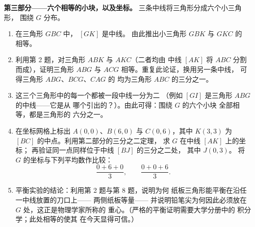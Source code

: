 \begin{problem}
\medskip
\noindent\textbf{第三部分——六个相等的小块，以及坐标。}
三条中线将三角形分成六个小三角形，
围绕 $G$ 分布。
\begin{enumerate}[resume]
  \item 在三角形 $GBC$ 中， $[GK]$ 是中线。
        由此推出小三角形 $GBK$ 与 $GKC$ 的
        相等。
  \item 利用第 2 题，对三角形 $ABK$ 与 $AKC$（二者均由
        中线 $[AK]$ 将 $ABC$ 分割而成），证明三角形 $ABG$ 与 $ACG$
        相等。重复此论证，换用另一条中线，
        可得三角形 $ABG$、$BCG$、$CAG$ 的
        均为三角形 $ABC$ 的三分之一。
  \item 这三个三角形中的每一个都被一段中线一分为二
        （例如 $[GI]$ 是三角形 $ABG$ 的中线——它是从
        哪个引出的？）。由此可得：围绕 $G$ 的六个小块
        全部相等，都是三角形的
        六分之一。
  \item 在坐标网格上标出 $A(0, 0)$、$B(6, 0)$ 与
        $C(0, 6)$，其中 $K(3, 3)$ 为 $[BC]$ 的中点。利用第二部分的三分之二定理，
        求 $G$ 在中线 $[AK]$ 上的坐标；
        再验证同一点同样位于中线 $[BJ]$ 的三分之二处，
        其中 $J(0, 3)$。
        将 $G$ 的坐标与下列平均数作比较：
        \[
        \frac{0 + 6 + 0}{3},
        \qquad
        \frac{0 + 0 + 6}{3} .
        \]
  \item 平衡实验的结论：利用第 2 题与第 8 题，说明为何
        纸板三角形能平衡在沿任一中线放置的刀口上——
        两侧纸板等量——
        并说明铅笔尖为何因此必须放在
        $G$ 处，这正是物理学家所称的
        重心。（严格的平衡证明需要大学分册中的
        积分学；此处相等的使其
        在今天显得可信。）
\end{enumerate}
\end{problem}
